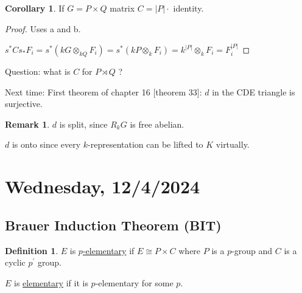 \documentclass{article}
\theoremstyle{definition}
\newtheorem*{definition}{Definition}
\newtheorem{corollary}[theorem]{Corollary}
\newtheorem*{remark}{Remark}
\begin{document}
\begin{corollary}
    If \(G = P \times Q\) matrix \(C = \vert P \vert \cdot\) identity.
\end{corollary}

\begin{proof}
    Uses a and b.

    \begin{center}
    \end{center}

    \(s^{\ast} C s_{\ast} F_i = s^{\ast} (kG \otimes_{kQ} F_i) = s^{\ast} (kP \otimes_{k} F_i) = k^{\vert P \vert} \otimes_{k} F_i = F_i^{\vert P \vert}\) 

\end{proof}

Question: what is \(C\) for \(P \rtimes Q\) ?

Next time: First theorem of chapter 16 [theorem 33]: \(d\) in the CDE triangle is surjective.

\begin{remark}
    \(d\) is split, since \(R_k G\) is free abelian.

    \(d\) is onto since every \(k\)-representation can be lifted to \(K\) virtually.
\end{remark}

\section*{Wednesday, 12/4/2024}

\subsection*{Brauer Induction Theorem (BIT)}

\begin{definition}
    \(E\) is \underline{\(p\)-elementary} if \(E \cong P \times C\) where \(P\) is a \(p\)-group and \(C\) is a cyclic \(p^{\prime}\) group.

    \(E\) is \underline{elementary} if it is \(p\)-elementary for some \(p\).
\end{definition}
\end{document}
